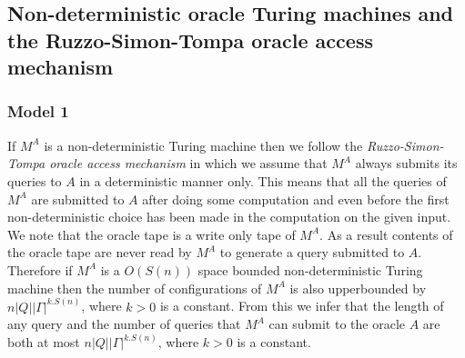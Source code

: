 \documentclass{amsbook}
\theoremstyle{definition}
\theoremstyle{remark}
\numberwithin{section}{chapter}
\numberwithin{equation}{chapter}
\begin{document}
\subsection{Non-deterministic oracle Turing machines and the Ruzzo-Simon-Tompa oracle access mechanism}\label{chap1-NOTM}
\subsubsection{Model 1}\label{chap1-NOTM-model1}
If $M^A$ is a non-deterministic Turing machine then we follow the \emph{Ruzzo-Simon-Tompa oracle access mechanism} in which we assume that $M^A$ always submits its queries to $A$ in a deterministic manner only. This means that all the queries of $M^A$ are submitted to $A$ after doing some computation and even before the first non-deterministic choice has been made in the computation on the given input. We note that the oracle tape is a write only tape of $M^A$. As a result contents of the oracle tape are never read by $M^A$ to generate a query submitted to $A$. Therefore if $M^A$ is a $O(S(n))$ space bounded non-deterministic Turing machine then the number of configurations of $M^A$ is also upperbounded by $n|Q||\Gamma |^{k.S(n)}$, where $k>0$ is a constant. From this we infer that the length of any query and the number of queries that $M^A$ can submit to the oracle $A$ are both at most $n|Q||\Gamma |^{k.S(n)}$, where $k>0$ is a constant.
\end{document}
